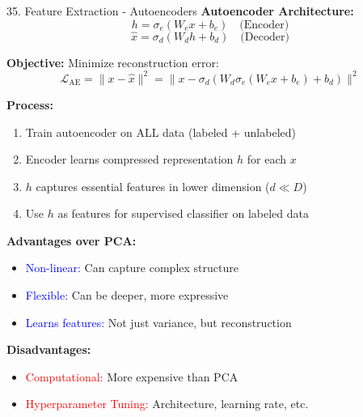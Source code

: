\documentclass[8pt]{beamer}
\begin{document}
	\begin{frame}{35. Feature Extraction - Autoencoders}
		\fontsize{6.5}{7.5}\selectfont
		\textbf{Autoencoder Architecture:}
		\[
		h = \sigma_e(W_e x + b_e) \quad \text{(Encoder)}
		\]
		\[
		\hat{x} = \sigma_d(W_d h + b_d) \quad \text{(Decoder)}
		\]
		
		\textbf{Objective:} Minimize reconstruction error:
		\[
		\mathcal{L}_{\text{AE}} = \|x - \hat{x}\|^2 = \|x - \sigma_d(W_d \sigma_e(W_e x + b_e) + b_d)\|^2
		\]
		
		\textbf{Process:}
		\begin{enumerate}
			\item Train autoencoder on ALL data (labeled + unlabeled)
			\item Encoder learns compressed representation $h$ for each $x$
			\item $h$ captures essential features in lower dimension ($d \ll D$)
			\item Use $h$ as features for supervised classifier on labeled data
		\end{enumerate}
		
		\textbf{Advantages over PCA:}
		\begin{itemize}
			\item \textcolor{blue}{Non-linear:} Can capture complex structure
			\item \textcolor{blue}{Flexible:} Can be deeper, more expressive
			\item \textcolor{blue}{Learns features:} Not just variance, but reconstruction
		\end{itemize}
		
		\textbf{Disadvantages:}
		\begin{itemize}
			\item \textcolor{red}{Computational:} More expensive than PCA
			\item \textcolor{red}{Hyperparameter Tuning:} Architecture, learning rate, etc.
		\end{itemize}
	\end{frame}
	
\end{document}
